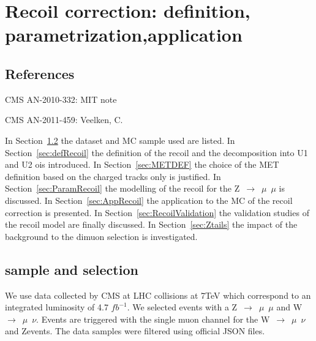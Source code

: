 \documentclass[41pt,a4paper,oneside]{report}
\begin{document}

\begin{titlepage}

\end{titlepage}
\author{Mariarosaria D'Alfonso}

\maketitle
\tableofcontents 


\chapter{Recoil correction: definition, parametrization,application}

\section{References}

\begin{description}
\item CMS AN-2010-332: MIT note
\item CMS AN-2011-459: Veelken, C.
\end{description}

In Section~\ref{sec:sampleSel} the dataset and MC sample used are listed.
In Section~\ref{sec:defRecoil} the definition of the recoil and the decomposition into U1 and U2 ois introduced.
In Section~\ref{sec:METDEF} the choice of the MET definition based on the charged tracks only is justified.
In Section~\ref{sec:ParamRecoil} the modelling of the recoil for the Z~$\rightarrow$~$\mu$~$\mu$ is discussed.
In Section~\ref{sec:AppRecoil} the application to the MC of the recoil correction is presented.
In Section~\ref{sec:RecoilValidation} the validation studies of the recoil model are finally discussed.
In Section~\ref{sec:Ztails} the impact of the background to the dimuon selection is investigated.

\section{sample and selection}
\label{sec:sampleSel}

We use data collected by CMS at LHC collisions at 7TeV which correspond to an integrated luminosity of 4.7 $fb^{-1}$.
We selected events with a Z~$\rightarrow$~$\mu$~$\mu$ and W~$\rightarrow$~$\mu$~$\nu$.
Events are triggered with the single muon channel for the W~$\rightarrow$~$\mu$~$\nu$ and Zevents.
The data samples were filtered using official JSON files. 
\end{document}
